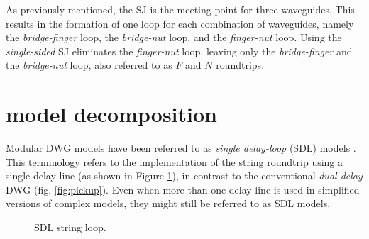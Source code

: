 \documentclass{sigchi}
\begin{document}
As previously mentioned, the SJ is the meeting point for three waveguides. This results in the formation of one loop for each combination of waveguides, namely the \textit{bridge-finger} loop, the \textit{bridge-nut} loop, and the \textit{finger-nut} loop. Using the \textit{single-sided} SJ eliminates the \textit{finger-nut} loop, leaving only the \textit{bridge-finger} and the \textit{bridge-nut} loop, also referred to as $F$ and $N$ roundtrips.

\section{model decomposition}

Modular DWG models have been referred to as \textit{single delay-loop} (SDL) models \cite{karjalainen_plucked-string_1998,pakarinen_physical_2005}. This terminology refers to the implementation of the string roundtrip using a single delay line (as shown in Figure \ref{fig:sdl_string_loop}), in contrast to the conventional \textit{dual-delay} DWG (fig. \ref{fig:pickup}). Even when more than one delay line is used in simplified versions of complex models, they might still be referred to as SDL models.
\begin{figure}[h]
	\centering
	\scalebox{0.75}{}
	\caption{SDL string loop.}
	\label{fig:sdl_string_loop}
\end{figure}

\end{document}
